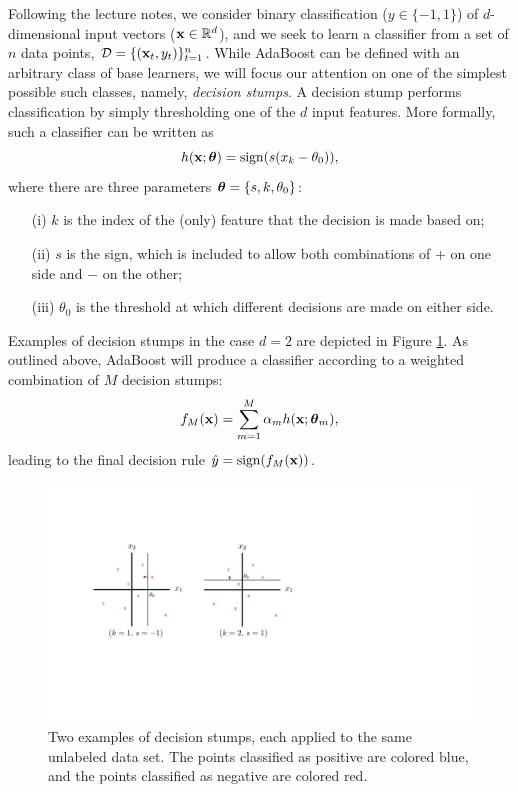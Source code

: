 \documentclass[english]{article}
\begin{document}
Following the lecture notes, we consider binary classification ($y \in \{-1,1\}$) of $d$-dimensional input vectors ($\mathbf{x} \in \mathbb{R}^d$), and we seek to learn a classifier from a set of $n$ data points, $\mathcal{D} = \{(\mathbf{x}_t,y_t)\}_{t=1}^n$.  While AdaBoost can be defined with an arbitrary class of base learners, we will focus our attention on one of the simplest possible such classes, namely, {\em decision stumps}.  A decision stump performs classification by simply thresholding one of the $d$ input features.  More formally, such a classifier can be written as
    $$ h(\mathbf{x}; \boldsymbol{\theta}) = \mathrm{sign}( s(x_k - \theta_0) ), $$
where there are three parameters $\boldsymbol{\theta} = \{s,k,\theta_0\}$:
\begin{itemize}
    \item[(i)] $k$ is the index of the (only) feature that the decision is made based on;
    \item[(ii)] $s$ is the sign, which is included to allow both combinations of $+$ on one side and $-$ on the other;
    \item[(iii)] $\theta_0$ is the threshold at which different decisions are made on either side.
\end{itemize}
Examples of decision stumps in the case $d=2$ are depicted in Figure \ref{fig:stumps}.  As outlined above, AdaBoost will produce a classifier according to a weighted combination of $M$ decision stumps:
    \begin{equation}
        f_M(\mathbf{x}) = \sum_{m=1}^M \alpha_m h(\mathbf{x}; \boldsymbol{\theta}_m), \label{eq:fM}
    \end{equation}
leading to the final decision rule $\hat{y} = \mathrm{sign}( f_M(\mathbf{x}) )$.

    \begin{figure}
        \centering
        \includegraphics[width=.6\textwidth]{stump_example}
        \par
        \caption{Two examples of decision stumps, each applied to the same unlabeled data set.  The points classified as positive are colored blue, and the points classified as negative are colored red. \label{fig:stumps}}
    \end{figure}   
\end{document}
